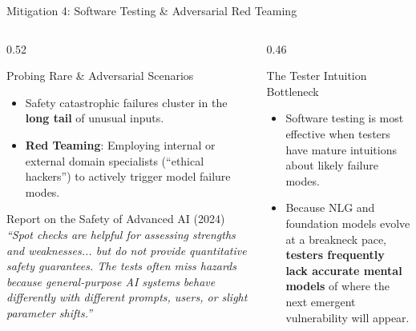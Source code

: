 \documentclass[aspectratio=169, 10pt]{beamer}
\begin{document}
\begin{frame}{Mitigation 4: Software Testing \& Adversarial Red Teaming}
  \begin{columns}[T]
    \begin{column}{0.52\textwidth}
      \begin{block}{Probing Rare \& Adversarial Scenarios}
        \begin{itemize}
          \item Safety catastrophic failures cluster in the \textbf{long tail} of unusual inputs.
          \item \textbf{Red Teaming}: Employing internal or external domain specialists (``ethical hackers'') to actively trigger model failure modes.
        \end{itemize}
      \end{block}

      \begin{alertbox}{Report on the Safety of Advanced AI (2024)}
        \small
        \textit{``Spot checks are helpful for assessing strengths and weaknesses... but do not provide quantitative safety guarantees. The tests often miss hazards because general-purpose AI systems behave differently with different prompts, users, or slight parameter shifts.''}
      \end{alertbox}
    \end{column}

    \begin{column}{0.46\textwidth}
      \begin{exampleblock}{The Tester Intuition Bottleneck}
        \begin{itemize}
          \item Software testing is most effective when testers have mature intuitions about likely failure modes.
          \item Because NLG and foundation models evolve at a breakneck pace, \textbf{testers frequently lack accurate mental models} of where the next emergent vulnerability will appear.
        \end{itemize}
      \end{exampleblock}
    \end{column}
  \end{columns}
\end{frame}
\end{document}
